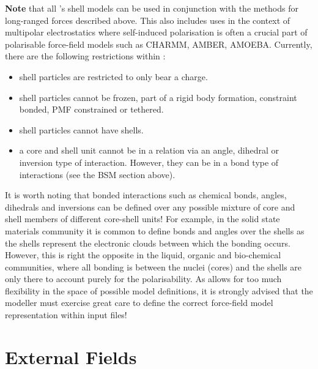 {\bf Note} that all \D's shell models
can be used in conjunction with the methods for long-ranged forces
described above.  This also includes uses in the context of multipolar
electrostatics where self-induced polarisation is often a crucial part
of polarisable force-field models such as CHARMM, AMBER, AMOEBA.
Currently, there are the following restrictions within \D:
\begin{itemize}
\item shell particles are restricted to only bear a charge.
\item shell particles cannot be frozen, part of a rigid body
formation, constraint bonded, PMF constrained or tethered.
\item shell particles cannot have shells.
\item a core and shell unit cannot be in a relation via an
angle, dihedral or inversion type of interaction.  However, they
can be in a bond type of interactions (see the BSM section above).
\end{itemize}
It is worth noting that bonded interactions such as chemical bonds,
angles, dihedrals and inversions can be defined over any possible mixture
of core and shell members of different core-shell units!  For example,
in the solid state materials community it is common to define bonds
and angles over the shells as the shells represent the electronic
clouds between which the bonding occurs.  However, this is right the
opposite in the liquid, organic and bio-chemical communities, where
all bonding is between the nuclei (cores) and the shells are only
there to account purely for the polarisability.  As \D allows for
too much flexibility in the space of possible model definitions, it is
strongly advised that the modeller must exercise great care to define
the correct force-field model representation within \D input files!

\section{External Fields}
\label{external-field}

